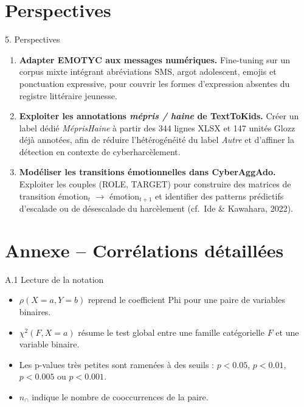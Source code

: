 \documentclass[aspectratio=169,10pt,xcolor=table]{beamer}
\begin{document}
\section{Perspectives}

\begin{frame}{5. Perspectives}
\small
\begin{enumerate}
  \item \textbf{Adapter EMOTYC aux messages numériques.}
    Fine-tuning sur un corpus mixte intégrant abréviations SMS, argot adolescent, emojis et ponctuation expressive, pour couvrir les formes d'expression absentes du registre littéraire jeunesse.

  \vspace{0.5em}
  \item \textbf{Exploiter les annotations \textit{mépris / haine} de TextToKids.}
    Créer un label dédié \textit{MéprisHaine} à partir des 344 lignes XLSX et 147 unités Glozz déjà annotées, afin de réduire l'hétérogénéité du label \textit{Autre} et d'affiner la détection en contexte de cyberharcèlement.

  \vspace{0.5em}
  \item \textbf{Modéliser les transitions émotionnelles dans CyberAggAdo.}
    Exploiter les couples (ROLE, TARGET) pour construire des matrices de transition émotion$_{t}$ $\rightarrow$ émotion$_{t+1}$ et identifier des patterns prédictifs d'escalade ou de désescalade du harcèlement (cf.\ Ide \& Kawahara, 2022).
\end{enumerate}
\end{frame}

\appendix
\section*{Annexe -- Corrélations détaillées}

\begin{frame}{A.1 Lecture de la notation}
\small
\begin{itemize}
  \item \(\rho(X=a,Y=b)\) reprend le coefficient Phi pour une paire de variables binaires.
  \item \(\chi^2(F, X=a)\) résume le test global entre une famille catégorielle \(F\) et une variable binaire.
  \item Les p-values très petites sont ramenées à des seuils : \(p<0.05\), \(p<0.01\), \(p<0.005\) ou \(p<0.001\).
  \item \(n_{\cap}\) indique le nombre de cooccurrences de la paire.
\end{itemize}
\end{frame}
\end{document}

